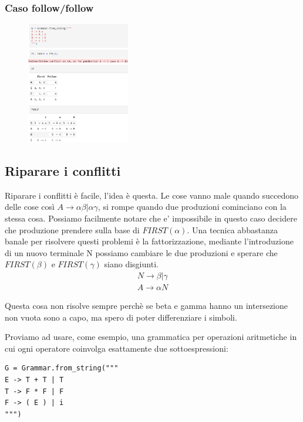 \subsubsection{Caso follow/follow}
\begin{figure}[ht!]
  \centering
  \includegraphics[width=0.4\textwidth]{images/Parsing/follow-follow.png}
\end{figure}

\subsection{Riparare i conflitti}
Riparare i conflitti è facile, l'idea è questa. Le cose vanno male quando succedono delle cose così $A \rightarrow \alpha \beta | \alpha \gamma$, si rompe quando due produzioni cominciano con la stessa cosa. Possiamo facilmente notare che e' impossibile in questo caso decidere che produzione prendere sulla base di $FIRST(\alpha)$. 
Una tecnica abbastanza banale per risolvere questi problemi è la fattorizzazione, mediante l'introduzione di un nuovo terminale N possiamo cambiare le due produzioni e sperare che $FIRST(\beta)$ e $FIRST(\gamma)$ siano disgiunti.
\[\begin{split}
  N \rightarrow \beta | \gamma \\
  A \rightarrow \alpha N
\end{split}\]

Questa cosa non risolve sempre perchè se beta e gamma hanno un intersezione non vuota sono a capo, ma spero di poter differenziare i simboli.

Proviamo ad usare, come esempio, una grammatica per operazioni aritmetiche in cui ogni operatore coinvolga esattamente due sottoespressioni:
\begin{lstlisting}
G = Grammar.from_string("""
E -> T + T | T
T -> F * F | F 
F -> ( E ) | i
""")
\end{lstlisting}

